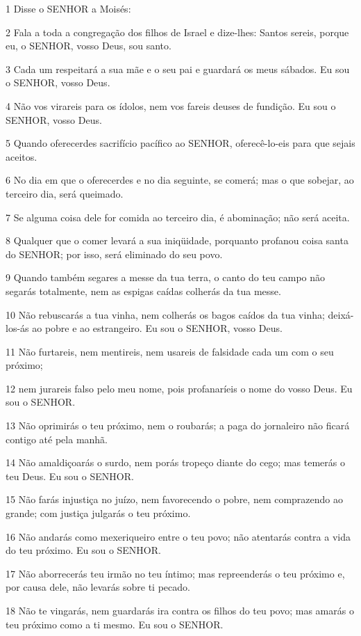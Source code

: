 \par 1 Disse o SENHOR a Moisés:
\par 2 Fala a toda a congregação dos filhos de Israel e dize-lhes: Santos sereis, porque eu, o SENHOR, vosso Deus, sou santo.
\par 3 Cada um respeitará a sua mãe e o seu pai e guardará os meus sábados. Eu sou o SENHOR, vosso Deus.
\par 4 Não vos virareis para os ídolos, nem vos fareis deuses de fundição. Eu sou o SENHOR, vosso Deus.
\par 5 Quando oferecerdes sacrifício pacífico ao SENHOR, oferecê-lo-eis para que sejais aceitos.
\par 6 No dia em que o oferecerdes e no dia seguinte, se comerá; mas o que sobejar, ao terceiro dia, será queimado.
\par 7 Se alguma coisa dele for comida ao terceiro dia, é abominação; não será aceita.
\par 8 Qualquer que o comer levará a sua iniqüidade, porquanto profanou coisa santa do SENHOR; por isso, será eliminado do seu povo.
\par 9 Quando também segares a messe da tua terra, o canto do teu campo não segarás totalmente, nem as espigas caídas colherás da tua messe.
\par 10 Não rebuscarás a tua vinha, nem colherás os bagos caídos da tua vinha; deixá-los-ás ao pobre e ao estrangeiro. Eu sou o SENHOR, vosso Deus.
\par 11 Não furtareis, nem mentireis, nem usareis de falsidade cada um com o seu próximo;
\par 12 nem jurareis falso pelo meu nome, pois profanaríeis o nome do vosso Deus. Eu sou o SENHOR.
\par 13 Não oprimirás o teu próximo, nem o roubarás; a paga do jornaleiro não ficará contigo até pela manhã.
\par 14 Não amaldiçoarás o surdo, nem porás tropeço diante do cego; mas temerás o teu Deus. Eu sou o SENHOR.
\par 15 Não farás injustiça no juízo, nem favorecendo o pobre, nem comprazendo ao grande; com justiça julgarás o teu próximo.
\par 16 Não andarás como mexeriqueiro entre o teu povo; não atentarás contra a vida do teu próximo. Eu sou o SENHOR.
\par 17 Não aborrecerás teu irmão no teu íntimo; mas repreenderás o teu próximo e, por causa dele, não levarás sobre ti pecado.
\par 18 Não te vingarás, nem guardarás ira contra os filhos do teu povo; mas amarás o teu próximo como a ti mesmo. Eu sou o SENHOR.
